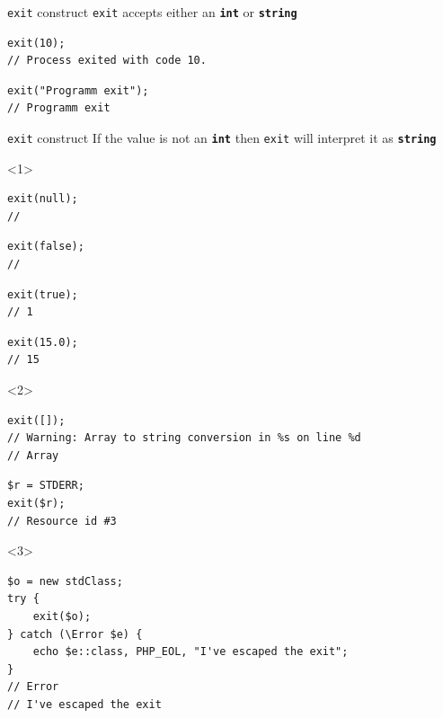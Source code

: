 \documentclass[aspectratio=169]{beamer}
\newcommand{\type}[1]{\texttt{\textbf{#1}}}
\begin{document}
\begin{frame}[fragile]{\texttt{exit} construct}
    \texttt{exit} accepts either an \type{int} or \type{string}
    \begin{verbatim}
exit(10);
// Process exited with code 10.
    \end{verbatim}
    \begin{verbatim}
exit("Programm exit");
// Programm exit
    \end{verbatim}
\end{frame}
\begin{frame}[fragile]{\texttt{exit} construct}
    If the value is not an \type{int} then \texttt{exit} will interpret it as \type{string}
    \begin{onlyenv}<1>
        \begin{verbatim}
exit(null);
//
        \end{verbatim}
        \begin{verbatim}
exit(false);
//
        \end{verbatim}
        \begin{verbatim}
exit(true);
// 1
        \end{verbatim}
        \begin{verbatim}
exit(15.0);
// 15
        \end{verbatim}
    \end{onlyenv}
    \begin{onlyenv}<2>
        \begin{verbatim}
exit([]);
// Warning: Array to string conversion in %s on line %d
// Array
        \end{verbatim}
        \begin{verbatim}
$r = STDERR;
exit($r);
// Resource id #3
        \end{verbatim}
    \end{onlyenv}
    \begin{onlyenv}<3>
        \begin{verbatim}
$o = new stdClass;
try {
    exit($o);
} catch (\Error $e) {
    echo $e::class, PHP_EOL, "I've escaped the exit";
}
// Error
// I've escaped the exit
        \end{verbatim}
    \end{onlyenv}
\end{frame}
\end{document}
